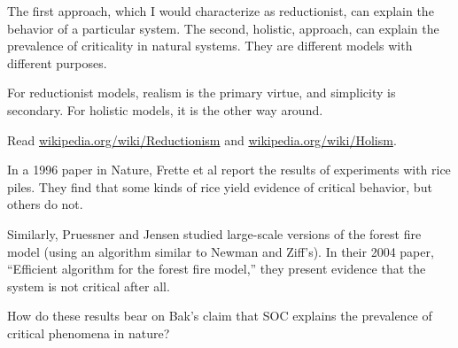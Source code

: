 \documentclass[10pt]{book}
\begin{document}
The first approach, which I would characterize as reductionist,
can explain the behavior of a particular system.  The
second, holistic, approach, can explain the prevalence of
criticality in natural systems.  They are different models
with different purposes.

For reductionist models, realism is the primary virtue, and
simplicity is secondary.  For holistic models, it is the other
way around.


\begin{ex}

Read \url{wikipedia.org/wiki/Reductionism}
and \url{wikipedia.org/wiki/Holism}.

\end{ex}


\begin{ex}

In a 1996 paper in Nature, Frette et al report the results of
experiments with rice piles.  They find that some kinds of rice
yield evidence of critical behavior, but others do not.

Similarly, Pruessner and Jensen studied large-scale versions of the
forest fire model (using an algorithm similar to Newman and Ziff's).
In their 2004 paper, ``Efficient algorithm for the forest fire model,''
they present evidence that the system is not critical after all.

How do these results bear on Bak's claim that SOC explains
the prevalence of critical phenomena in nature?

\end{ex}
\end{document}

